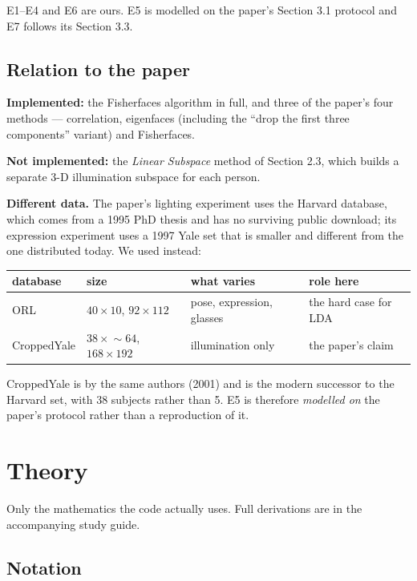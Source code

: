 \documentclass[11pt]{article}
\theoremstyle{remark}
\begin{document}
E1--E4 and E6 are ours. E5 is modelled on the paper's Section 3.1 protocol and
E7 follows its Section 3.3.

\subsection{Relation to the paper}

\textbf{Implemented:} the Fisherfaces algorithm in full, and three of the
paper's four methods --- correlation, eigenfaces (including the ``drop the
first three components'' variant) and Fisherfaces.

\textbf{Not implemented:} the \emph{Linear Subspace} method of Section 2.3,
which builds a separate 3-D illumination subspace for each person.

\textbf{Different data.} The paper's lighting experiment uses the Harvard
database, which comes from a 1995 PhD thesis and has no surviving public
download; its expression experiment uses a 1997 Yale set that is smaller and
different from the one distributed today. We used instead:

\begin{center}
\small
\begin{tabular}{llll}
\toprule
database & size & what varies & role here \\
\midrule
ORL        & $40\times10$, $92\!\times\!112$    & pose, expression, glasses & the hard case for LDA \\
CroppedYale & $38\times\!\sim\!64$, $168\!\times\!192$ & illumination only  & the paper's claim \\
\bottomrule
\end{tabular}
\end{center}

CroppedYale is by the same authors (2001) and is the modern successor to the
Harvard set, with 38 subjects rather than 5. E5 is therefore \emph{modelled on}
the paper's protocol rather than a reproduction of it.

\section{Theory}

Only the mathematics the code actually uses. Full derivations are in the
accompanying study guide.

\subsection{Notation}
\end{document}
